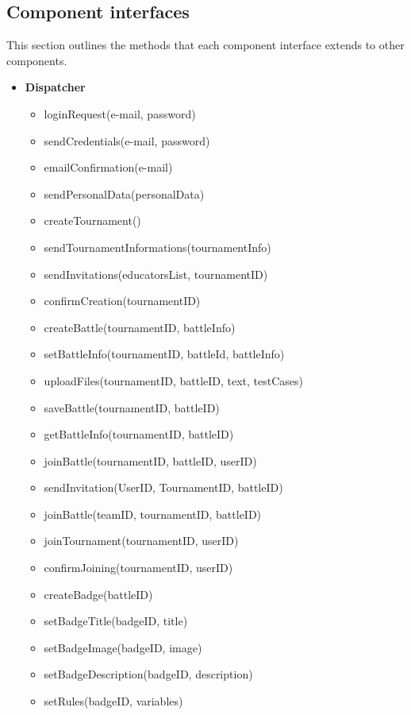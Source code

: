 \documentclass{article}
\begin{document}
\subsection{Component interfaces}
This section outlines the methods that each component interface extends to other components.
\begin{itemize}
    \item \textbf{Dispatcher}
        \begin{itemize}
            \item loginRequest(e-mail, password)
            \item sendCredentials(e-mail, password)
            \item emailConfirmation(e-mail)
            \item sendPersonalData(personalData)
            \item createTournament()
            \item sendTournamentInformations(tournamentInfo)
            \item sendInvitations(educatorsList, tournamentID)
            \item confirmCreation(tournamentID)
            \item createBattle(tournamentID, battleInfo)
            \item setBattleInfo(tournamentID, battleId, battleInfo)
            \item uploadFiles(tournamentID, battleID, text, testCases)
            \item saveBattle(tournamentID, battleID)
            \item getBattleInfo(tournamentID, battleID)
            \item joinBattle(tournamentID, battleID, userID)
            \item sendInvitation(UserID, TournamentID, battleID)
            \item joinBattle(teamID, tournamentID, battleID)
            \item joinTournament(tournamentID, userID)
            \item confirmJoining(tournamentID, userID)
            \item createBadge(battleID)
            \item setBadgeTitle(badgeID, title)
            \item setBadgeImage(badgeID, image)
            \item setBadgeDescription(badgeID, description)
            \item setRules(badgeID, variables)

\end{itemize}
\end{itemize}
\end{document}

